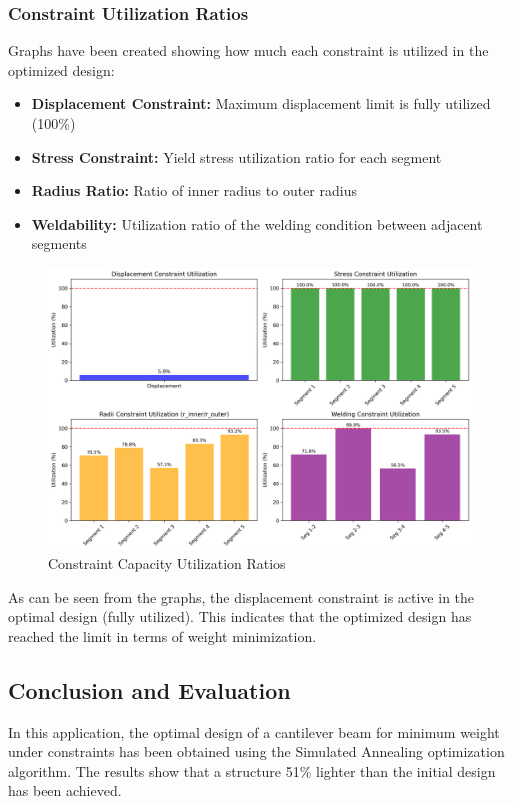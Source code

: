 \subsubsection{Constraint Utilization Ratios}
Graphs have been created showing how much each constraint is utilized in the optimized design:

\begin{itemize}
    \item \textbf{Displacement Constraint:} Maximum displacement limit is fully utilized (100\%)
    \item \textbf{Stress Constraint:} Yield stress utilization ratio for each segment
    \item \textbf{Radius Ratio:} Ratio of inner radius to outer radius
    \item \textbf{Weldability:} Utilization ratio of the welding condition between adjacent segments
\end{itemize}

\begin{figure}[H]
    \centering
    \includegraphics[width=1\textwidth]{weeks_new/imgs/constraint_utilization.png}
    \caption{Constraint Capacity Utilization Ratios}
    \label{fig:constraint_utilization}
\end{figure}

As can be seen from the graphs, the displacement constraint is active in the optimal design (fully utilized). This indicates that the optimized design has reached the limit in terms of weight minimization.

\subsection{Conclusion and Evaluation}
In this application, the optimal design of a cantilever beam for minimum weight under constraints has been obtained using the Simulated Annealing optimization algorithm. The results show that a structure 51\% lighter than the initial design has been achieved.


